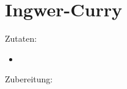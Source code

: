 \section{Ingwer-Curry}
Zutaten:
\begin{itemize}
    \item
\end{itemize}

Zubereitung:

\newpage
\mbox{}
\vfill
\begin{center}
\end{center}
\vfill
\mbox{ }
\newpage
